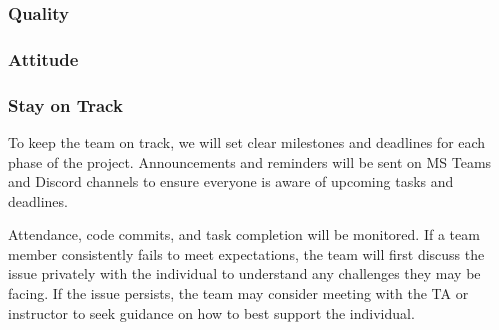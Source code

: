 \documentclass{article}
\begin{document}
\subsubsection*{Quality} 


\subsubsection*{Attitude}


\subsubsection*{Stay on Track}



To keep the team on track, we will set clear milestones and deadlines for each phase of the project.
Announcements and reminders will be sent on MS Teams and Discord channels
to ensure everyone is aware of upcoming tasks and deadlines.

Attendance, code commits, and task completion will be monitored. 
If a team member consistently fails to meet expectations, the team will first discuss the issue privately 
with the individual to understand any challenges they may be facing. If the issue persists, 
the team may consider meeting with the TA or instructor to seek guidance on how to best support the individual.
\end{document}
